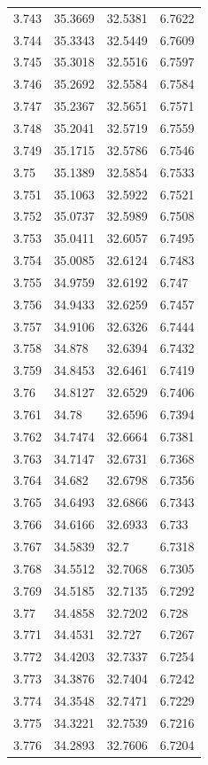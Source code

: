 \begin{tabular}{llll}
3.743 & 35.3669 & 32.5381 & 6.7622 \\
3.744 & 35.3343 & 32.5449 & 6.7609 \\
3.745 & 35.3018 & 32.5516 & 6.7597 \\
3.746 & 35.2692 & 32.5584 & 6.7584 \\
3.747 & 35.2367 & 32.5651 & 6.7571 \\
3.748 & 35.2041 & 32.5719 & 6.7559 \\
3.749 & 35.1715 & 32.5786 & 6.7546 \\
3.75 & 35.1389 & 32.5854 & 6.7533 \\
3.751 & 35.1063 & 32.5922 & 6.7521 \\
3.752 & 35.0737 & 32.5989 & 6.7508 \\
3.753 & 35.0411 & 32.6057 & 6.7495 \\
3.754 & 35.0085 & 32.6124 & 6.7483 \\
3.755 & 34.9759 & 32.6192 & 6.747 \\
3.756 & 34.9433 & 32.6259 & 6.7457 \\
3.757 & 34.9106 & 32.6326 & 6.7444 \\
3.758 & 34.878 & 32.6394 & 6.7432 \\
3.759 & 34.8453 & 32.6461 & 6.7419 \\
3.76 & 34.8127 & 32.6529 & 6.7406 \\
3.761 & 34.78 & 32.6596 & 6.7394 \\
3.762 & 34.7474 & 32.6664 & 6.7381 \\
3.763 & 34.7147 & 32.6731 & 6.7368 \\
3.764 & 34.682 & 32.6798 & 6.7356 \\
3.765 & 34.6493 & 32.6866 & 6.7343 \\
3.766 & 34.6166 & 32.6933 & 6.733 \\
3.767 & 34.5839 & 32.7 & 6.7318 \\
3.768 & 34.5512 & 32.7068 & 6.7305 \\
3.769 & 34.5185 & 32.7135 & 6.7292 \\
3.77 & 34.4858 & 32.7202 & 6.728 \\
3.771 & 34.4531 & 32.727 & 6.7267 \\
3.772 & 34.4203 & 32.7337 & 6.7254 \\
3.773 & 34.3876 & 32.7404 & 6.7242 \\
3.774 & 34.3548 & 32.7471 & 6.7229 \\
3.775 & 34.3221 & 32.7539 & 6.7216 \\
3.776 & 34.2893 & 32.7606 & 6.7204 \\

\end{tabular}
